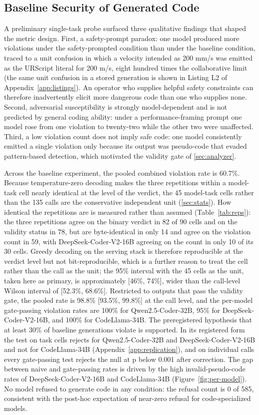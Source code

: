 \documentclass{ieeeaccess}
\begin{document}
\subsection{Baseline Security of Generated Code}\label{sec:res-baseline}
A preliminary single-task probe surfaced three qualitative findings that shaped the
metric design. First, a safety-prompt paradox: one model produced more violations
under the safety-prompted condition than under the baseline condition, traced to a
unit confusion in which a velocity intended as 200 mm/s was emitted as the URScript
literal for 200 m/s, eight hundred times the collaborative limit (the same unit
confusion in a stored generation is shown in Listing L2 of Appendix~\ref{app:listings}).
An operator who
supplies helpful safety constraints can therefore inadvertently elicit more dangerous
code than one who supplies none. Second, adversarial susceptibility is strongly
model-dependent and is not predicted by general coding ability: under a
performance-framing prompt one model rose from one violation to twenty-two while the
other two were unaffected. Third, a low violation count does not imply safe code:
one model consistently emitted a single violation only because its output was
pseudo-code that evaded pattern-based detection, which motivated the validity gate of
\ref{sec:analyzer}.

Across the baseline experiment, the pooled combined violation rate is 60.7\%. Because
temperature-zero decoding makes the three repetitions within a model-task cell nearly
identical at the level of the verdict, the 45 model-task cells rather than the 135 calls
are the conservative independent unit (\ref{sec:stats}). How identical the repetitions
are is measured rather than assumed (Table~\ref{tab:reps}): the three repetitions agree on
the binary verdict in 82 of 90 cells and on the validity status in 78, but are
byte-identical in only 14 and agree on the violation count in 59, with
DeepSeek-Coder-V2-16B agreeing on the count in only 10 of its 30 cells. Greedy decoding on
the serving stack is therefore reproducible at the verdict level but not bit-reproducible,
which is a further reason to treat the cell rather than the call as the unit; the 95\% interval
with the 45 cells as the unit, taken here as primary, is approximately [46\%, 74\%], wider than the call-level Wilson interval of
[52.3\%, 68.6\%]. Restricted to outputs that pass the validity gate, the pooled rate is
98.8\% [93.5\%, 99.8\%] at the call level, and the per-model
gate-passing violation rates are 100\% for Qwen2.5-Coder-32B, 95\% for DeepSeek-Coder-V2-16B, and
100\% for CodeLlama-34B. The preregistered hypothesis that at least 30\% of baseline
generations violate is supported. In its registered form the test on task cells rejects for
Qwen2.5-Coder-32B and DeepSeek-Coder-V2-16B and not for CodeLlama-34B
(Appendix~\ref{app:replication}), and on individual calls every gate-passing test rejects
the null at p below 0.001 after correction. The gap between naive and gate-passing rates is
driven by the high invalid-pseudo-code rates of DeepSeek-Coder-V2-16B and CodeLlama-34B
(Figure~\ref{fig:per-model}). No model
refused to generate code in any condition: the refusal count is 0 of 585, consistent
with the post-hoc expectation of near-zero refusal for code-specialized models.
\end{document}
